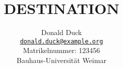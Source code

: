 \documentclass[a4paper]{article}
\theoremstyle{definition}
\theoremstyle{remark}
\begin{document}

\title{\textbf{%
    {{DESTINATION}}
}}

\author{Donald Duck\\
  \normalsize \href{mailto:donald.duck@example.org}
    {\nolinkurl{donald.duck@example.org}} \\
  \normalsize Matrikelnummer: 123456\\
  \vspace{3mm}
  \normalsize Bauhaus-Universit\"at Weimar\\
}


\maketitle


%
%
\end{document}
